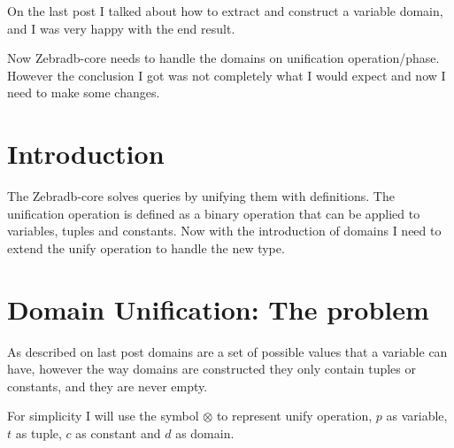 \documentclass{article}
\begin{document}
On the last post I talked about how to extract and construct a variable domain, and I was very happy with 
the end result. 

Now Zebradb-core needs to handle the domains on unification operation/phase.
However the conclusion I got was not completely what I would expect and now I need to make some changes. 

\section{Introduction}

The Zebradb-core solves queries by unifying them with definitions. 
The unification operation is defined as a binary operation that can be applied to variables, tuples and constants. 
Now with the introduction of domains I need to extend the unify operation to handle the new type.

\section{Domain Unification: The problem}

As described on last post domains are a set of possible values that a variable can have, however the way 
domains are constructed they only contain tuples or constants, and they are never empty. 

For simplicity I will use the symbol $\otimes$ to represent unify operation, 
$p$ as variable, $t$ as tuple, $c$ as constant and $d$ as domain.
\end{document}

